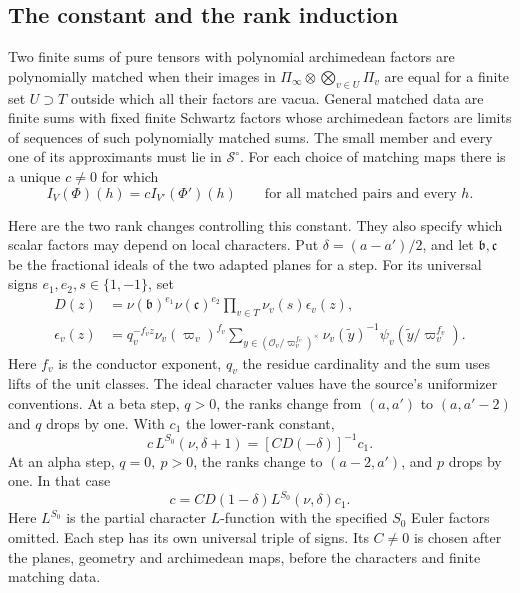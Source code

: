 \subsection{The constant and the rank induction}

Two finite sums of pure tensors with polynomial archimedean factors
are polynomially matched when their images in
\(\Pi_\infty\otimes\bigotimes_{v\in U}\Pi_v\) are equal for a
finite set \(U\supset T\) outside which all their factors are
vacua. General matched data are finite sums with fixed finite
Schwartz factors whose archimedean factors are limits of sequences
of such polynomially matched sums. The small member and every one
of its approximants must lie in \(\mathcal S^\circ\).
For each choice of matching maps there is a unique \(c\ne0\) for which
\begin{equation}
       I_V(\Phi)(h)=c I_{V'}(\Phi')(h)
       \qquad\text{for all matched pairs and every }h.
       \label{eq:theta-identity}
\end{equation}

Here are the two rank changes controlling this constant. They also
specify which scalar factors may depend on local characters. Put
\(\delta=(a-a')/2\), and let \(\mathfrak b,\mathfrak c\) be the
fractional ideals of the two adapted planes for a step. For its
universal signs \(e_1,e_2,s\in\{1,-1\}\), set
\begin{align*}
 D(z)&=\nu(\mathfrak b)^{e_1}\nu(\mathfrak c)^{e_2}
       \prod_{v\in T}\nu_v(s)\epsilon_v(z),\\
 \epsilon_v(z)&=q_v^{-f_vz}\nu_v(\varpi_v)^{f_v}
      \sum_{y\in(\mathcal O_v/\varpi_v^{f_v})^\times}
        \nu_v(\widetilde y)^{-1}\psi_v(\widetilde y/\varpi_v^{f_v}).
\end{align*}
Here \(f_v\) is the conductor exponent, \(q_v\) the residue cardinality
and the sum uses lifts of the unit classes. The ideal character
values have the source's uniformizer conventions. At a beta step,
\(q>0\), the ranks change from \((a,a')\) to \((a,a'-2)\)
and \(q\) drops by one. With \(c_1\) the lower-rank constant,
\[
        c\,L^{S_0}(\nu,\delta+1)
          =[C D(-\delta)]^{-1}c_1 .
\]
At an alpha step, \(q=0,\ p>0\), the ranks change to
\((a-2,a')\), and \(p\) drops by one. In that case
\[
        c=C D(1-\delta)L^{S_0}(\nu,\delta)c_1 .
\]
Here \(L^{S_0}\) is the partial character \(L\)-function with the
specified \(S_0\) Euler factors omitted. Each step has its own
universal triple of signs. Its \(C\ne0\) is chosen after the planes,
geometry and archimedean maps, before the characters and finite
matching data.

